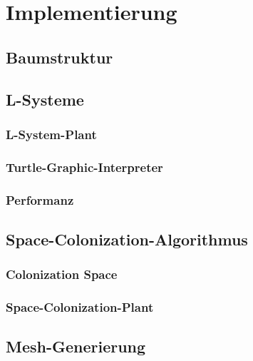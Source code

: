 \chapter{Implementierung}

\section{Baumstruktur}

\section{L-Systeme}

\subsection{L-System-Plant}

\subsection{Turtle-Graphic-Interpreter}

\subsection{Performanz}

\section{Space-Colonization-Algorithmus}

\subsection{Colonization Space}

\subsection{Space-Colonization-Plant}


\section{Mesh-Generierung}



